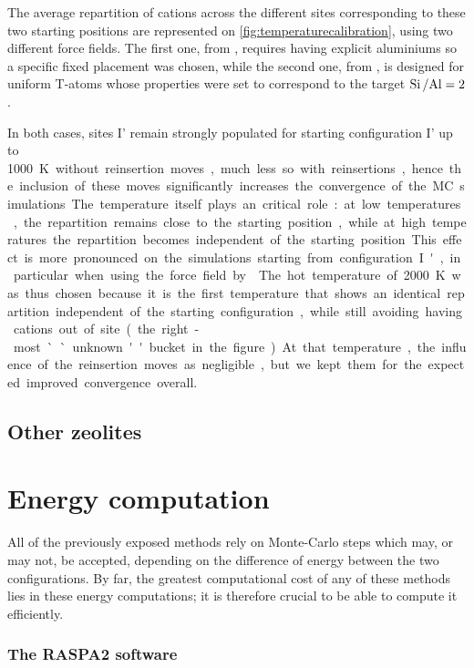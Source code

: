 \documentclass[main.tex]{subfiles}
\begin{document}
The average repartition of cations across the different sites corresponding to these two starting positions are represented on \cref{fig:temperaturecalibration}, using two different force fields. The first one, from \textcite{BoulfelfelSholl2021}, requires having explicit aluminiums so a specific fixed placement was chosen, while the second one, from \textcite{DiLellaFF}, is designed for uniform T-atoms whose properties were set to correspond to the target $\mbox{Si\,/Al} = 2$.

In both cases, sites I' remain strongly populated for starting configuration I' up to \qty{1000}K without reinsertion moves, much less so with reinsertions, hence the inclusion of these moves significantly increases the convergence of the MC simulations.

The temperature itself plays an critical role: at low temperatures, the repartition remains close to the starting position, while at high temperatures the repartition becomes independent of the starting position. This effect is more pronounced on the simulations starting from configuration I', in particular when using the force field by \textcite{DiLellaFF}. The hot temperature of \qty{2000}K was thus chosen because it is the first temperature that shows an identical repartition independent of the starting configuration, while still avoiding having cations out of site (the right-most ``unknown'' bucket in the figure). At that temperature, the influence of the reinsertion moves as negligible, but we kept them for the expected improved convergence overall.


\subsection{Other zeolites}



\section{Energy computation}\label{energy_computation}

All of the previously exposed methods rely on Monte-Carlo steps which may, or may not, be accepted, depending on the difference of energy between the two configurations. By far, the greatest computational cost of any of these methods lies in these energy computations; it is therefore crucial to be able to compute it efficiently.

\subsubsection{The RASPA2 software}
\end{document}
